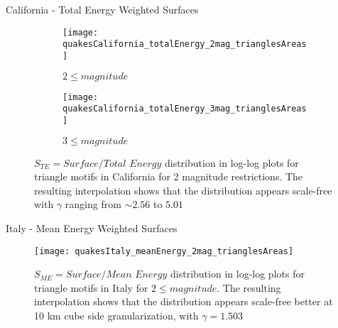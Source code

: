 \begin{frame}{California - Total Energy Weighted Surfaces}
\begin{figure}[h!]

\begin{subfigure}{.99\textwidth}
  \centering
  \texttt{[image: quakesCalifornia\_totalEnergy\_2mag\_trianglesAreas]}
  \caption{$2 \leq magnitude$}
  \label{fig:trianglesCaTE2}
\end{subfigure}%

\begin{subfigure}{.99\textwidth}
  \centering
  \texttt{[image: quakesCalifornia\_totalEnergy\_3mag\_trianglesAreas]}
  \caption{$3 \leq magnitude$}
  \label{fig:trianglesCaTe3}
\end{subfigure}%

\caption{$S_{TE} = Surface/Total$ $Energy$ distribution in log-log plots for triangle motifs in California for 2 magnitude restrictions. The resulting interpolation shows that the distribution appears scale-free with $\gamma$ ranging from $\sim 2.56$ to $5.01$ }
\label{fig:trianglesSurfacesCaTE}
\end{figure}
\end{frame}


\begin{frame}{Italy - Mean Energy Weighted Surfaces}

\begin{figure}[h!]
  \centering
  \texttt{[image: quakesItaly\_meanEnergy\_2mag\_trianglesAreas]}
  \label{fig:trianglesItME2}
\caption{$S_{ME} = Surface/Mean$ $Energy$ distribution in log-log plots for triangle motifs in Italy for $2 \leq magnitude$. The resulting interpolation shows that the distribution appears scale-free better at 10 km cube side granularization, with $\gamma = 1.503$ }
\label{fig:trianglesSurfacesItME}
\end{figure}
\end{frame}

